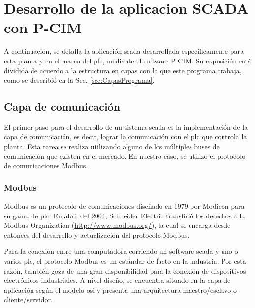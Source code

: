\section{Desarrollo de la aplicacion SCADA con P-CIM}
A continuación, se detalla la aplicación \gls{scada} desarrollada 
específicamente para esta planta y en el marco del \gls{pfe}, mediante el
software P-CIM. Su exposición está dividida de acuerdo a la estructura en capas
con la que este programa trabaja, como se describió en la Sec.
\ref{sec:CapasPrograma}.

\subsection{Capa de comunicación}
\label{subsec:CapaComunicacion}
El primer paso para el desarrollo de un sistema \gls{scada} es la 
implementación de la capa de comunicación, es decir, lograr la 
comunicación con el \gls{plc} que controla la planta. Esta tarea se realiza
utilizando alguno de los múltiples buses de comunicación que existen en el
mercado. En nuestro caso, se utilizó el protocolo de comunicaciones Modbus.

\subsubsection{Modbus}
Modbus es un protocolo de comunicaciones diseñado en 1979 por Modicon para su 
gama de \gls{plc}. En abril del 2004, Schneider Electric transfirió los 
derechos a la Modbus Organization (\url{http://www.modbus.org/}), la cual se 
encarga desde entonces del desarrollo y actualización del protocolo Modbus.

Para la conexión entre una computadora corriendo un software \gls{scada} y uno
o varios \gls{plc}, el protocolo Modbus es un estándar de facto en la industria.
Por esta razón, también goza de una gran disponibilidad para la conexión de
dispositivos electrónicos industriales. A nivel diseño, se encuentra situado en 
la capa de aplicación según el modelo \gls{osi} y presenta una arquitectura 
maestro/esclavo o cliente/servidor.



